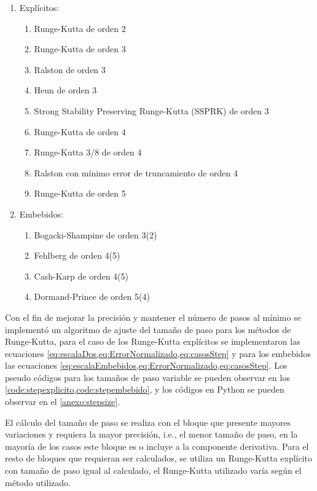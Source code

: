         \begin{enumerate}[leftmargin=\parindent]
            \item Explícitos:
                \begin{enumerate}
                    \item Runge-Kutta de orden 2
                    \item Runge-Kutta de orden 3
                    \item Ralston de orden 3
                    \item Heun de orden 3
                    \item Strong Stability Preserving Runge-Kutta (SSPRK) de orden 3
                    \item Runge-Kutta de orden 4
                    \item Runge-Kutta 3/8 de orden 4
                    \item Ralston con mínimo error de truncamiento de orden 4
                    \item Runge-Kutta de orden 5
                \end{enumerate}
            \item Embebidos:
                \begin{enumerate}
                    \item Bogacki-Shampine de orden 3(2)
                    \item Fehlberg de orden 4(5)
                    \item Cash-Karp de orden 4(5)
                    \item Dormand-Prince de orden 5(4)
                \end{enumerate}
        \end{enumerate}

        Con el fin de mejorar la precisión y mantener el número de pasos al mínimo se implementó un algoritmo de ajuste del tamaño de paso para los métodos de Runge-Kutta, para el caso de los Runge-Kutta explícitos se implementaron las ecuaciones \cref{eq:escalaDos,eq:ErrorNormalizado,eq:casosStep} y para los embebidos las ecuaciones \cref{eq:escalaEmbebidos,eq:ErrorNormalizado,eq:casosStep}. Los pseudo códigos para los tamaños de paso variable se pueden observar en los \cref{code:stepexplicito,code:stepembebido}, y los códigos en Python se pueden observar en el \ref{anexo:stepsize}.

        El cálculo del tamaño de paso se realiza con el bloque que presente mayores variaciones y requiera la mayor precisión, i.e., el menor tamaño de paso, en la mayoría de los casos este bloque es o incluye a la componente derivativa. Para el resto de bloques que requieran ser calculados, se utiliza un Runge-Kutta explícito con tamaño de paso igual al calculado, el Runge-Kutta utilizado varía según el método utilizado.

